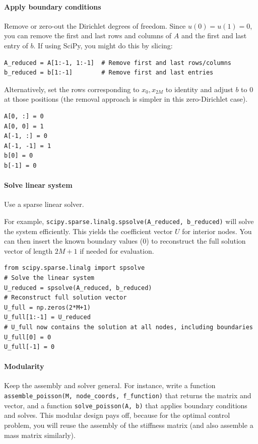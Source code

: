 \documentclass[a4paper,10pt]{report}
\begin{document}
\paragraph{Apply boundary conditions}
Remove or zero-out the Dirichlet degrees of freedom.
Since \(u(0)=u(1)=0\), you can remove the first and last rows and columns of \(A\) and the first and last entry of \(b\).
If using SciPy, you might do this by slicing:
\begin{verbatim}
A_reduced = A[1:-1, 1:-1]  # Remove first and last rows/columns
b_reduced = b[1:-1]        # Remove first and last entries
\end{verbatim}
Alternatively, set the rows corresponding to \(x_0,x_{2M}\) to identity and adjust \(b\) to 0 at those positions (the removal approach is simpler in this zero-Dirichlet case).
\begin{verbatim}
A[0, :] = 0
A[0, 0] = 1
A[-1, :] = 0
A[-1, -1] = 1
b[0] = 0
b[-1] = 0
\end{verbatim}

\paragraph{Solve linear system}
Use a sparse linear solver. 

For example, \texttt{scipy.sparse.linalg.spsolve(A_reduced, b_reduced)} will solve the system efficiently.
This yields the coefficient vector \(U\) for interior nodes.
You can then insert the known boundary values (0) to reconstruct the full solution vector of length \(2M+1\) if needed for evaluation.
\begin{verbatim}
from scipy.sparse.linalg import spsolve
# Solve the linear system
U_reduced = spsolve(A_reduced, b_reduced)
# Reconstruct full solution vector
U_full = np.zeros(2*M+1)
U_full[1:-1] = U_reduced
# U_full now contains the solution at all nodes, including boundaries
U_full[0] = 0
U_full[-1] = 0
\end{verbatim}

\paragraph{Modularity}
Keep the assembly and solver general. For instance, write a function \texttt{assemble_poisson(M, node_coords, f_function)} that returns the matrix and vector, and a function \texttt{solve_poisson(A, b)} that applies boundary conditions and solves.
This modular design pays off, because for the optimal control problem, you will reuse the assembly of the stiffness matrix (and also assemble a mass matrix similarly).
\end{document}
